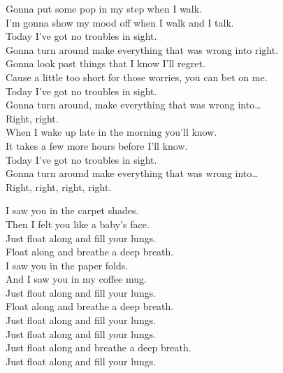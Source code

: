 Gonna put some pop in my step when I walk. \\
I'm gonna show my mood off when I walk and I talk. \\
Today I've got no troubles in sight. \\
Gonna turn around make everything that was wrong into right. \\

Gonna look past things that I know I'll regret. \\
Cause  a little too short for those worries, you can bet on me. \\
Today I've got no troubles in sight. \\
Gonna turn around, make everything that was wrong into… \\
Right, right. \\

When I wake up late in the morning you'll know. \\
It takes a few more hours before I'll know. \\
Today I've got no troubles in sight. \\
Gonna turn around make everything that was wrong into… \\
Right, right, right, right. \\




I saw you in the carpet shades. \\
Then I felt you like a baby's face. \\
Just float along and fill your lungs. \\
Float along and breathe a deep breath. \\

I saw you in the paper folds. \\
And I saw you in my coffee mug. \\
Just float along and fill your lungs. \\
Float along and breathe a deep breath. \\

Just float along and fill your lungs. \\
Just float along and fill your lungs. \\
Just float along and breathe a deep breath. \\
Just float along and fill your lungs. \\
